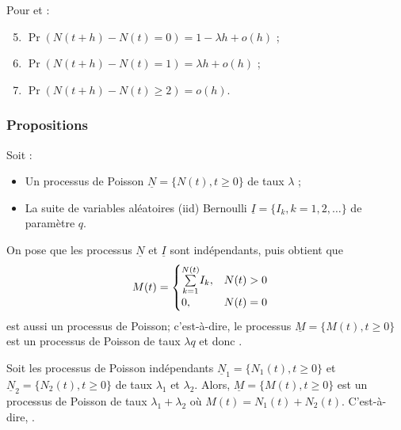 \documentclass[10pt, french]{article}
\begin{document}
\begin{multicols*}{2}
\begin{definitionNOHFILLprop}
Pour  et  :
\begin{enumerate}[label = \rectangled{\arabic*}{lightgray}]
	\setcounter{enumi}{4}
	\item	$\Pr(N(t + h) - N(t) = 0)	=	1 - \lambda h + o(h)$ ;
	\item	$\Pr(N(t + h) - N(t) = 1)	=	\lambda h + o(h)$ ;
	\item	$\Pr(N(t + h) - N(t) \geq 2)	=	o(h)$.
\end{enumerate}
\end{definitionNOHFILLprop}



\subsubsection{Propositions}
\begin{definitionNOHFILLpropos}
Soit :
\begin{itemize}
	\item	Un processus de Poisson $\underline{N}	=	\{N(t), t \geq 0\}$ de taux $\lambda$ ;
	\item	La suite de variables aléatoires (iid) Bernoulli $\underline{I}	=	\{I_{k}, k	=		1, 2, \dots\}$ de paramètre $q$.
\end{itemize}

On pose que les processus $\underline{N}$ et $\underline{I}$ sont indépendants, puis obtient que 
\begin{align*}
	M(t)
	&=	\begin{cases}
		\overset{N(t)}{\underset{k	=	1}{\sum}} I_{k}, &	N(t)	>	0	\\
		0,	&	N(t)	=	0
		\end{cases}
\end{align*}
est aussi un processus de Poisson; c'est-à-dire, le processus $\underline{M}	=	\{M(t), t \geq 0\}$ est un processus de Poisson de taux $\lambda q$ et donc .
\end{definitionNOHFILLpropos}

\begin{definitionNOHFILLpropos}
Soit les processus de Poisson indépendants $\underline{N}_{1}	=	\{N_{1}(t), t \geq 0\}$ et $\underline{N}_{2}	=	\{N_{2}(t), t \geq 0\}$ de taux $\lambda_{1}$ et $\lambda_{2}$. Alors, $\underline{M}	=	\{M(t), t \geq 0\}$ est un processus de Poisson de taux $\lambda_{1} + \lambda_{2}$ où $M(t)	=	N_{1}(t) + N_{2}(t)$. C'est-à-dire, .
\end{definitionNOHFILLpropos}



\end{multicols*}
\end{document}
